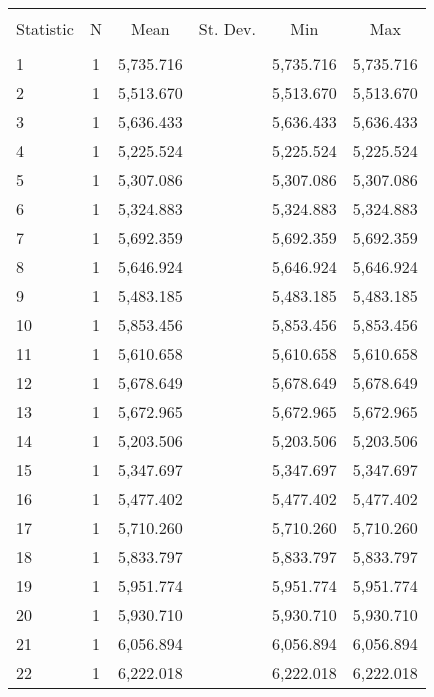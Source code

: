 
\begin{table}[!htbp] \centering 
  \caption{} 
  \label{} 
\begin{tabular}{@{\extracolsep{5pt}}lccccc} 
\\[-1.8ex]\hline 
\hline \\[-1.8ex] 
Statistic & \multicolumn{1}{c}{N} & \multicolumn{1}{c}{Mean} & \multicolumn{1}{c}{St. Dev.} & \multicolumn{1}{c}{Min} & \multicolumn{1}{c}{Max} \\ 
\hline \\[-1.8ex] 
1 & 1 & 5,735.716 &  & 5,735.716 & 5,735.716 \\ 
2 & 1 & 5,513.670 &  & 5,513.670 & 5,513.670 \\ 
3 & 1 & 5,636.433 &  & 5,636.433 & 5,636.433 \\ 
4 & 1 & 5,225.524 &  & 5,225.524 & 5,225.524 \\ 
5 & 1 & 5,307.086 &  & 5,307.086 & 5,307.086 \\ 
6 & 1 & 5,324.883 &  & 5,324.883 & 5,324.883 \\ 
7 & 1 & 5,692.359 &  & 5,692.359 & 5,692.359 \\ 
8 & 1 & 5,646.924 &  & 5,646.924 & 5,646.924 \\ 
9 & 1 & 5,483.185 &  & 5,483.185 & 5,483.185 \\ 
10 & 1 & 5,853.456 &  & 5,853.456 & 5,853.456 \\ 
11 & 1 & 5,610.658 &  & 5,610.658 & 5,610.658 \\ 
12 & 1 & 5,678.649 &  & 5,678.649 & 5,678.649 \\ 
13 & 1 & 5,672.965 &  & 5,672.965 & 5,672.965 \\ 
14 & 1 & 5,203.506 &  & 5,203.506 & 5,203.506 \\ 
15 & 1 & 5,347.697 &  & 5,347.697 & 5,347.697 \\ 
16 & 1 & 5,477.402 &  & 5,477.402 & 5,477.402 \\ 
17 & 1 & 5,710.260 &  & 5,710.260 & 5,710.260 \\ 
18 & 1 & 5,833.797 &  & 5,833.797 & 5,833.797 \\ 
19 & 1 & 5,951.774 &  & 5,951.774 & 5,951.774 \\ 
20 & 1 & 5,930.710 &  & 5,930.710 & 5,930.710 \\ 
21 & 1 & 6,056.894 &  & 6,056.894 & 6,056.894 \\ 
22 & 1 & 6,222.018 &  & 6,222.018 & 6,222.018 \\ 

\end{tabular}
\end{table}
